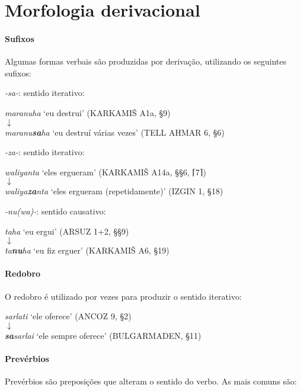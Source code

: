 \section{Morfologia derivacional}

\paragraph{Sufixos}
Algumas formas verbais são produzidas por derivação, utilizando os seguintes
sufixos:
\begin{compactenum}[(a)]
	\item \emph{-sa-}: sentido iterativo:
	\begin{center}
		\emph{maranuha} `eu destrui' (KARKAMIŠ A1a, §9)\\
		$\downarrow$\\
		\emph{maranu\textbf{sa}ha} `eu destruí várias vezes' (TELL AHMAR 6, §6)
	\end{center}
	\item \emph{-za-}: sentido iterativo:
	\begin{center}
		\emph{waliyanta} `eles ergueram' (KARKAMIŠ A14a, §§6, \textsc{⌈}7\textsc{⌉})\\
		$\downarrow$\\
		\emph{waliya\textbf{za}nta} `eles ergueram (repetidamente)' (IZGIN 1, §18)
	\end{center}
	\item \emph{-nu{(wa)}-}: sentido causativo:
	\begin{center}
		\emph{taha} `eu ergui' (ARSUZ 1+2, §§9)\\
		$\downarrow$\\
		\emph{ta\textbf{nu}ha} `eu fiz erguer' (KARKAMIŠ A6, §19)
	\end{center}
\end{compactenum}

\paragraph{Redobro}
O redobro é utilizado por vezes para produzir o sentido iterativo:
\begin{center}
	\emph{sarlati} `ele oferece' (ANCOZ 9, §2)\\
	$\downarrow$\\
	\emph{\textbf{sa}sarlai} `ele sempre oferece' (BULGARMADEN, §11)
\end{center}

\paragraph{Prevérbios}
Prevérbios são preposições que alteram o sentido do verbo.
As mais comuns são:

